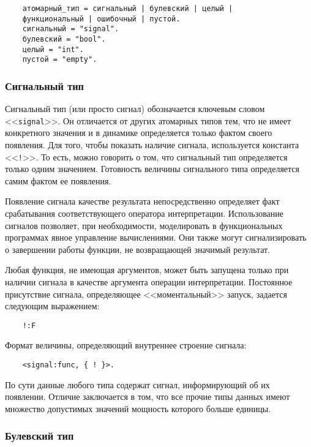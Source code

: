 {\begin{verbatim}
    атомарный_тип = сигнальный | булевский | целый |
    функциональный | ошибочный | пустой.
    сигнальный = "signal".
    булевский = "bool".
    целый = "int".
    пустой = "empty".
\end{verbatim}

\subsubsection{Сигнальный тип}

Сигнальный тип (или просто сигнал) обозначается ключевым словом <<\verb|signal|>>. Он отличается от других атомарных типов тем, что не имеет конкретного значения и в динамике определяется только фактом своего появления. Для того, чтобы показать наличие сигнала, используется константа <<\verb|!|>>. То есть, можно говорить о том, что сигнальный тип определяется только одним значением. Готовность величины сигнального типа определяется самим фактом ее появления.

Появление сигнала качестве результата непосредственно определяет факт срабатывания соответствующего оператора интерпретации. Использование сигналов позволяет, при необходимости, моделировать в функциональных программах явное управление вычислениями. Они также могут сигнализировать о завершении работы функции, не возвращающей значимый результат.

Любая функция, не имеющая аргументов, может быть запущена только при наличии сигнала в качестве аргумента операции интерпретации. Постоянное присутствие сигнала, определяющее <<моментальный>> запуск, задается следующим выражением:

\begin{verbatim}
    !:F
\end{verbatim}

Формат величины, определяющий внутреннее строение сигнала:

\begin{verbatim}
    <signal:func, { ! }>.
\end{verbatim}

По сути данные любого типа содержат сигнал, информирующий об их появлении. Отличие заключается в том, что все прочие типы данных имеют множество допустимых значений мощность которого больше единицы.

\subsubsection{Булевский тип}

}
